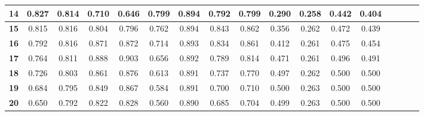 \begin{table*}[!t]
\begin{tabular}{|c|c|c|c|c|c|c|c|c|c|c|c|c|c|c|c|c|}
\hline\bfseries 14 & 0.827 & 0.814 & 0.710 & 0.646 & 0.799 & 0.894 & 0.792 & 0.799 & 0.290 & 0.258 & 0.442 & 0.404 \\
\hline\bfseries 15 & 0.815 & 0.816 & 0.804 & 0.796 & 0.762 & 0.894 & 0.843 & 0.862 & 0.356 & 0.262 & 0.472 & 0.439 \\
\hline\bfseries 16 & 0.792 & 0.816 & 0.871 & 0.872 & 0.714 & 0.893 & 0.834 & 0.861 & 0.412 & 0.261 & 0.475 & 0.454 \\
\hline\bfseries 17 & 0.764 & 0.811 & 0.888 & 0.903 & 0.656 & 0.892 & 0.789 & 0.814 & 0.471 & 0.261 & 0.496 & 0.491 \\
\hline\bfseries 18 & 0.726 & 0.803 & 0.861 & 0.876 & 0.613 & 0.891 & 0.737 & 0.770 & 0.497 & 0.262 & 0.500 & 0.500 \\
\hline\bfseries 19 & 0.684 & 0.795 & 0.849 & 0.867 & 0.584 & 0.891 & 0.700 & 0.710 & 0.500 & 0.263 & 0.500 & 0.500 \\
\hline
\bfseries 20 & 0.650 & 0.792 & 0.822 & 0.828 & 0.560 & 0.890 & 0.685 & 0.704 & 0.499 & 0.263 & 0.500 & 0.500 \\
\hline
\end{tabular}
\end{table*}

